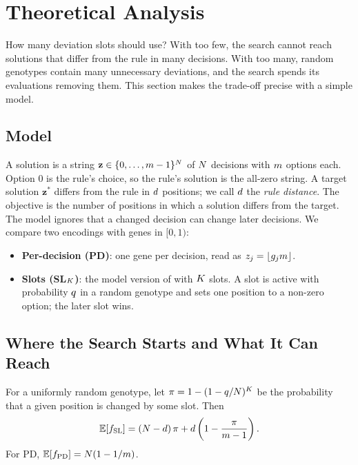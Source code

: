 \section{Theoretical Analysis}
\label{sec:theory}


How many deviation slots should \RDD use?
With too few, the search cannot reach solutions that differ from the rule in many decisions.
With too many, random genotypes contain many unnecessary deviations, and the search spends its evaluations removing them.
This section makes the trade-off precise with a simple model.

\subsection{Model}
\label{sec:theory:model}

A solution is a string $\mathbf{z} \in \{0, \dots, m-1\}^{N}$ of $N$ decisions with $m$ options each.
Option 0 is the rule's choice, so the rule's solution is the all-zero string.
A target solution $\mathbf{z}^\ast$ differs from the rule in $d$ positions; we call $d$ the \emph{rule distance}.
The objective is the number of positions in which a solution differs from the target.
The model ignores that a changed decision can change later decisions.
We compare two encodings with genes in $[0,1)$:
\begin{itemize}
  \item \textbf{Per-decision (PD)}: one gene per decision, read as $z_j = \lfloor g_j m \rfloor$.
  \item \textbf{Slots (SL$_K$)}: the model version of \RDD with $K$ slots. A slot is active with probability $q$ in a random genotype and sets one position to a non-zero option; the later slot wins.
\end{itemize}

\subsection{Where the Search Starts and What It Can Reach}
\label{sec:theory:props}

\begin{proposition}
\label{prop:init}
For a uniformly random genotype, let $\pi = 1 - (1 - q/N)^K$ be the probability that a given position is changed by some slot. Then
\begin{equation}
  \mathbb{E}[f_{\mathrm{SL}}] = (N - d)\,\pi + d \left(1 - \frac{\pi}{m-1}\right).
\end{equation}
For PD, $\mathbb{E}[f_{\mathrm{PD}}] = N (1 - 1/m)$.
\end{proposition}

